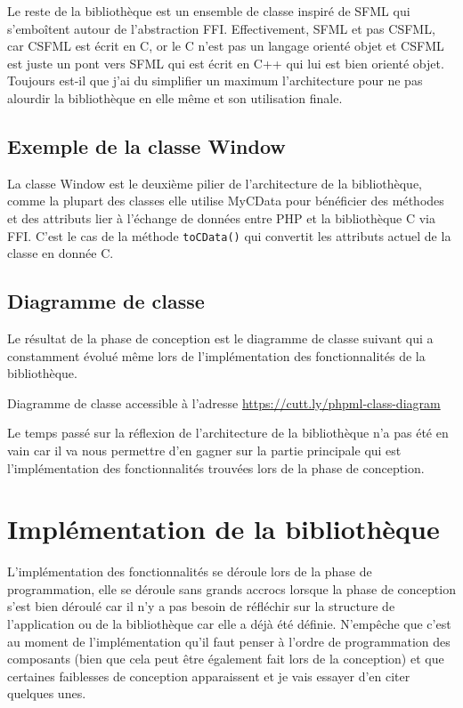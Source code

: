 \documentclass[11pt,a4paper,krantz2,11pt,oneside]{krantz}
\begin{document}
Le reste de la bibliothèque est un ensemble de classe inspiré de SFML qui s'emboîtent autour de l'abstraction FFI. Effectivement, SFML et pas CSFML, car CSFML est écrit en C, or le C n'est pas un langage orienté objet et CSFML est juste un pont vers SFML qui est écrit en C++ qui lui est bien orienté objet. Toujours est-il que j'ai du simplifier un maximum l'architecture pour ne pas alourdir la bibliothèque en elle même et son utilisation finale.

\hypertarget{exemple-de-la-classe-window}{%
\subsection{Exemple de la classe Window}\label{exemple-de-la-classe-window}}

La classe Window est le deuxième pilier de l'architecture de la bibliothèque, comme la plupart des classes elle utilise MyCData pour bénéficier des méthodes et des attributs lier à l'échange de données entre PHP et la bibliothèque C via FFI. C'est le cas de la méthode \texttt{toCData()} qui convertit les attributs actuel de la classe en donnée C.

\hypertarget{diagramme-de-classe}{%
\subsection{Diagramme de classe}\label{diagramme-de-classe}}

Le résultat de la phase de conception est le diagramme de classe suivant qui a constamment évolué même lors de l'implémentation des fonctionnalités de la bibliothèque.

\label{fig:class-diagramm}Diagramme de classe accessible à l'adresse \url{https://cutt.ly/phpml-class-diagram}

Le temps passé sur la réflexion de l'architecture de la bibliothèque n'a pas été en vain car il va nous permettre d'en gagner sur la partie principale qui est l'implémentation des fonctionnalités trouvées lors de la phase de conception.

\hypertarget{impluxe9mentation-de-la-bibliothuxe8que}{%
\section{Implémentation de la bibliothèque}\label{impluxe9mentation-de-la-bibliothuxe8que}}

L'implémentation des fonctionnalités se déroule lors de la phase de programmation, elle se déroule sans grands accrocs lorsque la phase de conception s'est bien déroulé car il n'y a pas besoin de réfléchir sur la structure de l'application ou de la bibliothèque car elle a déjà été définie. N'empêche que c'est au moment de l'implémentation qu'il faut penser à l'ordre de programmation des composants (bien que cela peut être également fait lors de la conception) et que certaines faiblesses de conception apparaissent et je vais essayer d'en citer quelques unes.
\end{document}
